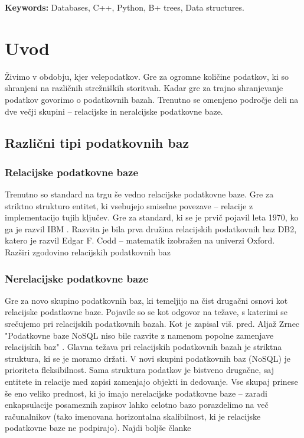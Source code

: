 \documentclass[a4paper,12pt,openright]{book}
\newcommand{\tkeywordsEn}{Databases, C++, Python, B+ trees, Data structures}
\newcommand{\clearemptydoublepage}{\newpage{\pagestyle{empty}\cleardoublepage}}
\begin{document}
\noindent\textbf{Keywords:} \tkeywordsEn.
\clearemptydoublepage

\mainmatter
\setcounter{page}{1}
\pagestyle{fancy}


\chapter{Uvod}
    Živimo v obdobju, kjer velepodatkov. Gre za ogromne količine podatkov, ki so shranjeni na različnih strežniških storitvah. Kadar gre za trajno shranjevanje podatkov govorimo o podatkovnih bazah. Trenutno se omenjeno področje deli na dve večji skupini – relacijske in neralcijske podatkovne baze.
    \section{Različni tipi podatkovnih baz}
        \subsection{Relacijske podatkovne baze}
        Trenutno so standard na trgu še vedno relacijske podatkovne baze. Gre za striktno strukturo entitet, ki vsebujejo smiselne povezave – relacije z implementacijo tujih ključev. Gre za standard, ki se je prvič pojavil leta 1970, ko ga je razvil IBM \cite{IBM_DMBS_1970}. Razvita je bila prva družina relacijskih podatkovnih baz DB2, katero je razvil Edgar F. Codd – matematik izobražen na univerzi Oxford.
        \colorbox{BurntOrange}{Razširi zgodovino relacijskih podatkovnih baz}
        \subsection{Nerelacijske podatkovne baze}
        Gre za novo skupino podatkovnih baz, ki temeljijo na čist drugačni osnovi kot relacijske podatkovne baze. Pojavile so se kot odgovor na težave, s katerimi se srečujemo pri relacijskih podatkovnih bazah. Kot je zapisal viš. pred. Aljaž Zrnec "Podatkovne baze NoSQL niso bile razvite z namenom popolne zamenjave relacijskih baz" \cite{zrnec2011podatkovne}. Glavna težava pri relacijskih podatkovnih bazah je striktna struktura, ki se je moramo držati. V novi skupini podatkovnih baz (NoSQL) je prioriteta fleksibilnost. Sama struktura podatkov je bistveno drugačne, saj entitete in relacije med zapisi zamenjajo objekti in dedovanje. Vse skupaj prinese še eno veliko prednost, ki jo imajo nerelacijske podatkovne baze – zaradi enkapsulacije posameznih zapisov lahko celotno bazo porazdelimo na več računalnikov (tako imenovana horizontalna skalibilnost, ki je relacijske podatkovne baze ne podpirajo).
        \colorbox{BurntOrange}{Najdi boljše članke}
    
\end{document}
